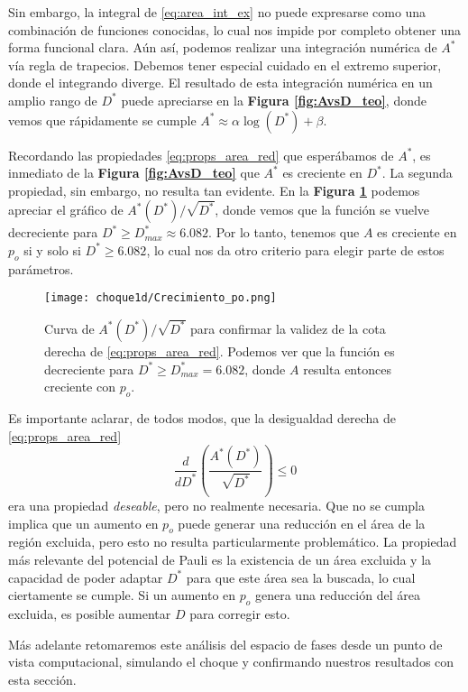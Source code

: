 Sin embargo, la integral de \eqref{eq:area_int_ex} no puede expresarse como una combinación de funciones conocidas, lo cual nos impide por completo obtener una forma funcional clara.
Aún así, podemos realizar una integración numérica de $A^*$ vía regla de trapecios.
Debemos tener especial cuidado en el extremo superior, donde el integrando diverge.
El resultado de esta integración numérica en un amplio rango de $D^*$ puede apreciarse en la \textbf{Figura \ref{fig:AvsD_teo}}, donde vemos que rápidamente se cumple $A^* \approx \alpha \log(D^*) + \beta$.

Recordando las propiedades \eqref{eq:props_area_red} que esperábamos de $A^*$, es inmediato de la \textbf{Figura \ref{fig:AvsD_teo}} que $A^*$ es creciente en $D^*$.
La segunda propiedad, sin embargo, no resulta tan evidente.
En la \textbf{Figura \ref{fig:AvsD_teo_cota}} podemos apreciar el gráfico de $A^*(D^*)/\sqrt{D^*}$, donde vemos que la función se vuelve decreciente para $D^*\geq D^*_{max}\approx6.082$.
Por lo tanto, tenemos que $A$ es creciente en $p_o$ si y solo si $D^*\geq 6.082$, lo cual nos da otro criterio para elegir parte de estos parámetros. 
\begin{figure}[H]
	\centering
	\texttt{[image: choque1d/Crecimiento\_po.png]}
	\caption{Curva de $A^*(D^*)/\sqrt{D^*}$ para confirmar la validez de la cota derecha de \eqref{eq:props_area_red}.
	Podemos ver que la función es decreciente para $D^*\geq D_{max}^* =6.082$, donde $A$ resulta entonces creciente con $p_o$.}
	\label{fig:AvsD_teo_cota}
\end{figure}

Es importante aclarar, de todos modos, que la desigualdad derecha de \eqref{eq:props_area_red}
\[ \frac{d}{dD^*} \left(\frac{A^*(D^*)}{\sqrt{D^*}}\right) \leq 0 \]
era una propiedad \textit{deseable}, pero no realmente necesaria.
Que no se cumpla implica que un aumento en $p_o$ puede generar una reducción en el área de la región excluida, pero esto no resulta particularmente problemático.
La propiedad más relevante del potencial de Pauli es la existencia de un área excluida y la capacidad de poder adaptar $D^*$ para que este área sea la buscada, lo cual ciertamente se cumple.
Si un aumento en $p_o$ genera una reducción del área excluida, es posible aumentar $D$ para corregir esto.

Más adelante retomaremos este análisis del espacio de fases desde un punto de vista computacional, simulando el choque y confirmando nuestros resultados con esta sección.




